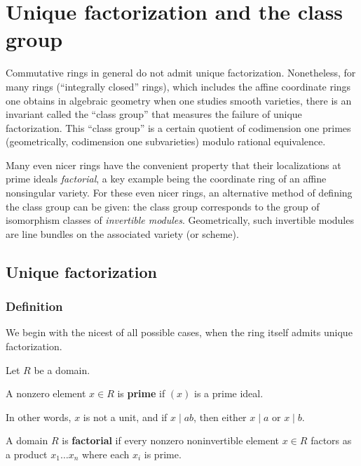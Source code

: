 \chapter{Unique factorization and the class group}


Commutative rings in general do not admit unique factorization. 
Nonetheless, for many rings (``integrally closed'' rings), which
includes the affine coordinate rings one obtains in algebraic geometry when
one studies smooth varieties, there is an invariant called the ``class
group'' that measures the failure of unique factorization. This ``class
group'' is a certain quotient of codimension one primes (geometrically,
codimension one subvarieties) modulo rational equivalence.

Many even nicer rings have the convenient property that their localizations at prime
ideals \emph{factorial}, a key example being the coordinate ring of an affine
nonsingular variety. 
For these even nicer rings, an alternative method of defining the class group
can be given: the class group corresponds to the group of isomorphism
classes of \emph{invertible modules}. Geometrically, such invertible modules
are line bundles on the associated variety (or scheme).

\section{Unique factorization}

\subsection{Definition}
We begin with the nicest of all possible cases, when the ring itself admits
unique factorization.



Let $R$ be a domain.  
\begin{definition} 
A nonzero element $x \in R$ is \textbf{prime} if $(x)$ is a prime ideal.
\end{definition} 

In other words, $x$ is not a unit, and if $x \mid ab$, then either $x \mid a$
or $x \mid b$. 

\begin{definition} 
A domain $R$ is \textbf{factorial} if every nonzero noninvertible element $x \in R$ factors as a
product $ x_1 \dots x_n$ where each $x_i$ is prime. 
\end{definition}

